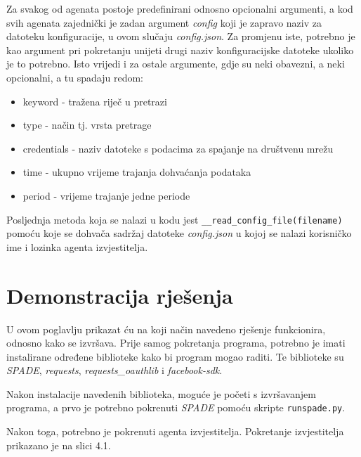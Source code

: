 \documentclass[a4paper,12pt]{foi}
\begin{document}
Za svakog od agenata postoje predefinirani odnosno opcionalni argumenti, a kod svih agenata zajednički je zadan argument \textit{config} koji je zapravo naziv za datoteku konfiguracije, u ovom slučaju \textit{config.json}. Za promjenu iste, potrebno je kao argument pri pokretanju unijeti drugi naziv konfiguracijske datoteke ukoliko je to potrebno. Isto vrijedi i za ostale argumente, gdje su neki obavezni, a neki opcionalni, a tu spadaju redom:

\begin{itemize}
\item{keyword - tražena riječ u pretrazi}
\item{type - način tj. vrsta pretrage}
\item{credentials - naziv datoteke s podacima za spajanje na društvenu mrežu}
\item{time - ukupno vrijeme trajanja dohvaćanja podataka}
\item{period - vrijeme trajanje jedne periode}
\end{itemize}

Posljednja metoda koja se nalazi u kodu jest \texttt{\_\_read\_config\_file(filename)} pomoću koje se dohvača sadržaj datoteke \textit{config.json} u kojoj se nalazi korisničko ime i lozinka agenta izvjestitelja.

\lstset{commentstyle=\textit,language=python}



\chapter{Demonstracija rješenja}

U ovom poglavlju prikazat ću na koji način navedeno rješenje funkcionira, odnosno kako se izvršava. Prije samog pokretanja programa, potrebno je imati instalirane određene biblioteke kako bi program mogao raditi. Te biblioteke su \textit{SPADE}, \textit{requests}, \textit{requests\_oauthlib} i \textit{facebook-sdk}.

Nakon instalacije navedenih biblioteka, moguće je početi s izvršavanjem programa, a prvo je potrebno pokrenuti \textit{SPADE} pomoću skripte \texttt{runspade.py}.

Nakon toga, potrebno je pokrenuti agenta izvjestitelja. Pokretanje izvjestitelja prikazano je na slici 4.1.
\end{document}
